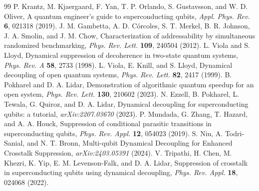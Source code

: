 \documentclass[aps,prl,twocolumn,amsmath,amssymb,superscriptaddress,floatfix]{revtex4-2}
\begin{document}
\begin{thebibliography}{99}
 P. Krantz, M. Kjaergaard, F. Yan, T. P. Orlando, S. Gustavsson, and W. D. Oliver, A quantum engineer's guide to superconducting qubits, \textit{Appl. Phys. Rev.} \textbf{6}, 021318 (2019).
 J. M. Gambetta, A. D. C\'orcoles, S. T. Merkel, B. R. Johnson, J. A. Smolin, and J. M. Chow, Characterization of addressability by simultaneous randomized benchmarking, \textit{Phys. Rev. Lett.} \textbf{109}, 240504 (2012).
 L. Viola and S. Lloyd, Dynamical suppression of decoherence in two-state quantum systems, \textit{Phys. Rev. A} \textbf{58}, 2733 (1998).
 L. Viola, E. Knill, and S. Lloyd, Dynamical decoupling of open quantum systems, \textit{Phys. Rev. Lett.} \textbf{82}, 2417 (1999).
 B. Pokharel and D. A. Lidar, Demonstration of algorithmic quantum speedup for an open system, \textit{Phys. Rev. Lett.} \textbf{130}, 210602 (2023).
 N. Ezzell, B. Pokharel, L. Tewala, G. Quiroz, and D. A. Lidar, Dynamical decoupling for superconducting qubits: a tutorial, \textit{arXiv:2207.03670} (2023).
 P. Mundada, G. Zhang, T. Hazard, and A. A. Houck, Suppression of conditional parasitic transitions in superconducting qubits, \textit{Phys. Rev. Appl.} \textbf{12}, 054023 (2019).
 S. Niu, A. Todri-Sanial, and N. T. Bronn, Multi-qubit Dynamical Decoupling for Enhanced Crosstalk Suppression, \textit{arXiv:2403.05391} (2024).
 V. Tripathi, H. Chen, M. Khezri, K. Yip, E. M. Levenson-Falk, and D. A. Lidar, Suppression of crosstalk in superconducting qubits using dynamical decoupling, \textit{Phys. Rev. Appl.} \textbf{18}, 024068 (2022).
\end{thebibliography}
\end{document}
